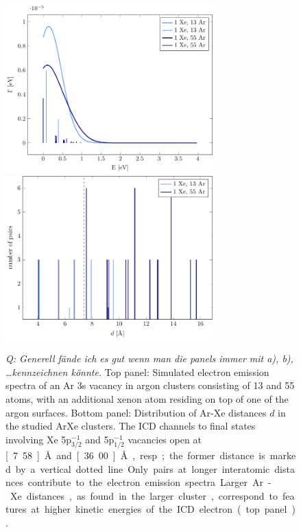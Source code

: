 \begin{figure}[H]
 \centering
 \includegraphics[width=8.0cm]{pics/surf.pdf}\\
 \includegraphics[width=8.0cm]{pics/R_comp.pdf}
 \caption{
 {\it Q: Generell f\"ande ich es gut wenn man die panels immer mit a), b), \dots kennzeichnen k\"onnte.}
 Top panel: Simulated electron emission spectra of an Ar 3s vacancy in 
          argon clusters
          consisting of 13 and 55 atoms, with an additional xenon atom residing
          on top of one of the argon surfaces.
          Bottom panel: Distribution of Ar-Xe distances $d$ in the studied ArXe
          clusters. The ICD channels to final states involving Xe 5p$_{3/2}^{-1}$ and 
          5p$_{1/2}^{-1}$ vacancies open at \unit[7.58]{\AA} and
          \unit[36.00]{\AA}, resp.; the former distance is marked by a vertical dotted line. 
          Only pairs at longer interatomic
          distances contribute to the electron emission spectra.
          Larger Ar-Xe distances, as found in the larger cluster,
          correspond to features at higher kinetic energies of
          the ICD electron (top panel).}
 \label{figure:surf}
\end{figure}


